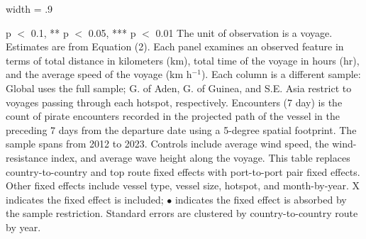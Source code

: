 \begin{table}
\begin{adjustbox}{width = .9\textwidth}
\begin{threeparttable}
\begin{tablenotes}
\item \scriptsize * p $<$ 0.1, ** p $<$ 0.05, *** p $<$ 0.01 The unit of observation is a voyage. Estimates are from Equation (2). Each panel examines an observed feature in terms of total distance in kilometers (km), total time of the voyage in hours (hr), and the average speed of the voyage (km h$^{-1}$). Each column is a different sample: Global uses the full sample; G. of Aden, G. of Guinea, and S.E. Asia restrict to voyages passing through each hotspot, respectively. Encounters (7 day) is the count of pirate encounters recorded in the projected path of the vessel in the preceding 7 days from the departure date using a 5-degree spatial footprint. The sample spans from 2012 to 2023. Controls include average wind speed, the wind-resistance index, and average wave height along the voyage. This table replaces country-to-country and top route fixed effects with port-to-port pair fixed effects. Other fixed effects include vessel type, vessel size, hotspot, and month-by-year. X indicates the fixed effect is included; $\bullet$ indicates the fixed effect is absorbed by the sample restriction. Standard errors are clustered by country-to-country route by year.
\end{tablenotes}
\end{threeparttable}
\end{adjustbox}
\end{table}

